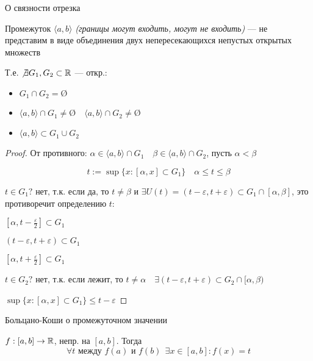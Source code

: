 

\cfoot{}

\usepackage{xcolor}


    \begin{lemma}
        О связности отрезка

        Промежуток $\langle a, b\rangle$ \textit{(границы могут входить, могут не входить)} --- не представим в виде объединения двух непересекающихся непустых открытых множеств

        Т.е. $\not\exists G_1, G_2 \subset \operatorname*{\mathbb{R}}$ --- откр.:
        \begin{itemize}
            \item $G_1\cap G_2=\text{\O}$
            \item $\langle a, b\rangle \cap G_1 \not=\text{\O} \quad \langle a, b\rangle \cap G_2 \not=\text{\O}$
            \item $\langle a, b\rangle \subset G_1\cup G_2$
        \end{itemize}
    \end{lemma}
    \begin{proof}
        От противного: $\alpha\in \langle a, b\rangle \cap G_1 \quad \beta\in \langle a, b\rangle \cap G_2$, пусть $\alpha<\beta$

        $$t:=\sup\{x:[\alpha, x]\subset G_1\} \quad \alpha\leq t\leq\beta$$

        $t\in G_1? \text{ нет, т.к. если да, то } t\not=\beta \text{ и } \exists U(t)=(t-\varepsilon, t+\varepsilon)\subset G_1\cap[\alpha, \beta]$, это противоречит определению $t$:

        $[\alpha, t-\frac{\varepsilon}{2}]\subset G_1$

        $(t-\varepsilon, t+\varepsilon)\subset G_1$

        $[\alpha, t+\frac{\varepsilon}{2}]\subset G_1$

        $t\in G_2?$ нет, т.к. если лежит, то $t\not=\alpha \quad \exists(t-\varepsilon, t+\varepsilon)\subset G_2 \cap [\alpha, \beta)$

        $\sup\{x:[\alpha, x]\subset G_1\}\leq t-\varepsilon$
    \end{proof}
    \begin{theorem}
        Больцано-Коши о промежуточном значении

        $f:[a,b]\to\operatorname*{\mathbb{R}}$, непр. на $[a,b]$. Тогда
        $$\forall t\text{ между } f(a) \text{ и } f(b) \ \ \exists x\in[a,b] : f(x)=t$$
    \end{theorem}
